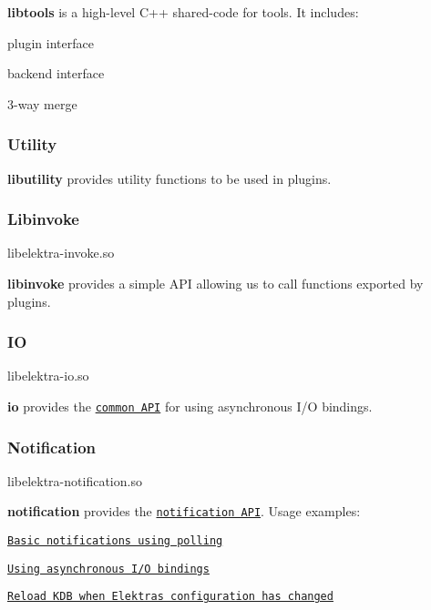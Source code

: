 {\bfseries libtools} is a high-\/level C++ shared-\/code for tools. It includes\+:


\begin{DoxyItemize}
\item plugin interface
\item backend interface
\item 3-\/way merge
\end{DoxyItemize}

\subsubsection*{Utility}

{\bfseries libutility} provides utility functions to be used in plugins.

\subsubsection*{Libinvoke}

\begin{DoxyVerb}libelektra-invoke.so
\end{DoxyVerb}


{\bfseries libinvoke} provides a simple A\+PI allowing us to call functions exported by plugins.

\subsubsection*{IO}

\begin{DoxyVerb}libelektra-io.so
\end{DoxyVerb}


{\bfseries io} provides the \href{https://doc.libelektra.org/api/current/html/group__kdbio.html}{\tt common A\+PI} for using asynchronous I/O bindings.

\subsubsection*{Notification}

\begin{DoxyVerb}libelektra-notification.so
\end{DoxyVerb}


{\bfseries notification} provides the \href{https://doc.libelektra.org/api/current/html/group__kdbnotification.html}{\tt notification A\+PI}. Usage examples\+:


\begin{DoxyItemize}
\item \href{https://www.libelektra.org/examples/notificationpolling}{\tt Basic notifications using polling}
\item \href{https://www.libelektra.org/examples/notificationasync}{\tt Using asynchronous I/O bindings}
\item \href{https://www.libelektra.org/examples/notificationreload}{\tt Reload K\+DB when Elektra\textquotesingle{}s configuration has changed}
\end{DoxyItemize}


